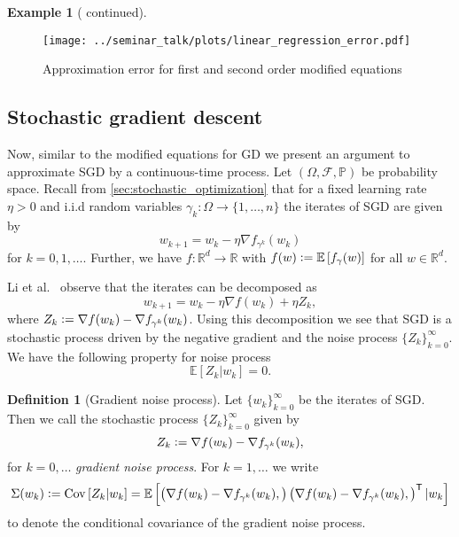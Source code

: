 \documentclass[12pt]{article}
\theoremstyle{definition}
\newtheorem{example}[example]{Example}
\newtheorem{definition}[definition]{Definition}
\numberwithin{equation}{section}
\newcommand{\R}{\mathbb{R}}
\newcommand{\BP}{\mathbb{P}}
\newcommand{\CF}{\mathcal{F}}
\newcommand{\T}{\mathsf{T}}
\newcommand{\ev}[1]{\mathbb{E}\left[{#1}\right]}
\newcommand{\defeq}{\vcentcolon=}
\DeclareMathOperator{\Cov}{Cov}
\begin{document}
\begin{example}[ continued]
  \begin{figure}[htb]
    \centering
    \texttt{[image: ../seminar\_talk/plots/linear\_regression\_error.pdf]}
    \caption{Approximation error for first and second order modified equations}
    \label{fig:linear_regression_error}
  \end{figure}
\end{example}
\subsection{Stochastic gradient descent}
\label{sec:smde_sgd}
Now, similar to the modified equations for GD we present an argument to approximate SGD by a continuous-time process.
Let $(\Omega, \CF, \BP)$ be probability space. Recall from \autoref{sec:stochastic_optimization} that for a fixed learning rate $\eta > 0$ and i.i.d random variables $\gamma_k:\Omega \rightarrow \{1,\dots,n\}$ the iterates of SGD are given by
\begin{equation*}
  w_{k+1} = w_{k} - \eta \nabla f_{\gamma^k}(w_{k})
\end{equation*}
for $k = 0,1,\dots$. Further, we have $f : \R^d \rightarrow \R$ with $f(w) \defeq \ev{f_\gamma(w)}$ for all $w \in \R^d$.

Li et al.\ \cite{liStochasticModifiedEquations2019} observe that the iterates can be decomposed as
\begin{equation}
  \label{eq:sgd_decomposition}
  w_{k+1} = w_{k} - \eta \nabla f(w_{k}) + \eta Z_k,
\end{equation}
where $Z_k \defeq \nabla f(w_{k}) - \nabla f_{\gamma^k}(w_{k})$.
Using this decomposition we see that SGD is a stochastic process driven by the negative gradient and the noise process $\{Z_k\}_{k=0}^\infty$. We have the following property for noise process
\begin{equation*}
  \ev{Z_k|w_{k}} = 0.
\end{equation*}
\begin{definition}[Gradient noise process]
  Let $\{w_k\}_{k=0}^\infty$ be the iterates of SGD. Then we call the stochastic process $\{Z_k\}_{k=0}^\infty$ given by
  \begin{equation*}
    Z_k \defeq \nabla f(w_{k}) - \nabla f_{\gamma^k}(w_{k}),
  \end{equation*}
  for $k=0,\dots$ \emph{gradient noise process}. For $k = 1, \dots$ we write 
  \begin{equation*}
    \Sigma(w_k) \defeq \Cov\left[Z_k|w_{k}\right] = \ev{\left(\nabla f(w_{k}) - \nabla f_{\gamma^k}(w_{k}),\right)\left(\nabla f(w_{k}) - \nabla f_{\gamma^k}(w_{k}),\right)^\T |w_k}
  \end{equation*}
  to denote the conditional covariance of the gradient noise process.
\end{definition}
\end{document}
